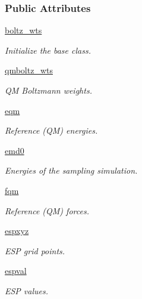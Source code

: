 \subsubsection*{Public Attributes}
\begin{DoxyCompactItemize}
\item 
\hyperlink{classforcebalance_1_1abinitio_1_1AbInitio_ac442f096d11d0294235f2c8cbe1dcbb4}{boltz\-\_\-wts}
\begin{DoxyCompactList}\small\item\em Initialize the base class. \end{DoxyCompactList}\item 
\hyperlink{classforcebalance_1_1abinitio_1_1AbInitio_a06ec6b12d81791ca94f599f41e56335a}{qmboltz\-\_\-wts}
\begin{DoxyCompactList}\small\item\em Q\-M Boltzmann weights. \end{DoxyCompactList}\item 
\hyperlink{classforcebalance_1_1abinitio_1_1AbInitio_a64387fae9bdfb0d03ca6961e67c779be}{eqm}
\begin{DoxyCompactList}\small\item\em Reference (Q\-M) energies. \end{DoxyCompactList}\item 
\hyperlink{classforcebalance_1_1abinitio_1_1AbInitio_af928d333d14cb3b93f7db78530455873}{emd0}
\begin{DoxyCompactList}\small\item\em Energies of the sampling simulation. \end{DoxyCompactList}\item 
\hyperlink{classforcebalance_1_1abinitio_1_1AbInitio_af025be2ce97da3e8dc876d70e403f4ef}{fqm}
\begin{DoxyCompactList}\small\item\em Reference (Q\-M) forces. \end{DoxyCompactList}\item 
\hyperlink{classforcebalance_1_1abinitio_1_1AbInitio_a8be2d088afb344036aae989ca3cbcc41}{espxyz}
\begin{DoxyCompactList}\small\item\em E\-S\-P grid points. \end{DoxyCompactList}\item 
\hyperlink{classforcebalance_1_1abinitio_1_1AbInitio_aba6d885086d455fce8c3d472fd08020d}{espval}
\begin{DoxyCompactList}\small\item\em E\-S\-P values. \end{DoxyCompactList}\item 

\end{DoxyCompactItemize}
